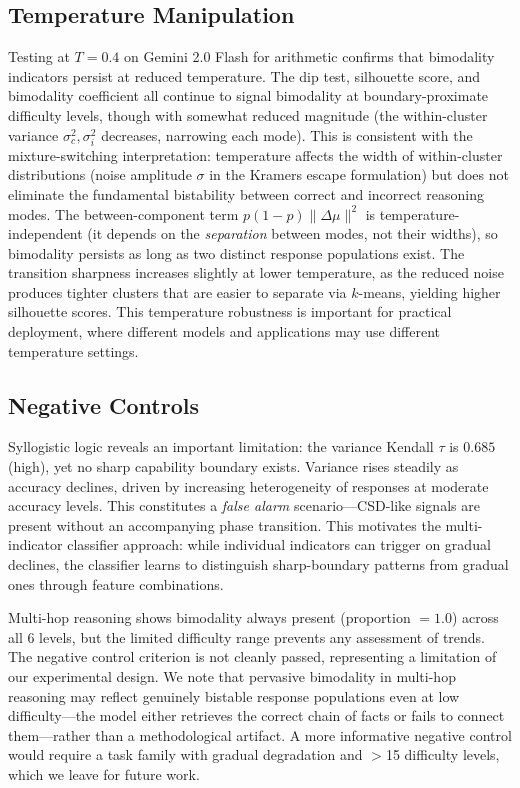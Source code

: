 \documentclass[11pt,letterpaper]{article}
\begin{document}
\subsection{Temperature Manipulation}

Testing at $T = 0.4$ on Gemini 2.0 Flash for arithmetic confirms that bimodality indicators persist at reduced temperature. The dip test, silhouette score, and bimodality coefficient all continue to signal bimodality at boundary-proximate difficulty levels, though with somewhat reduced magnitude (the within-cluster variance $\sigma_c^2, \sigma_i^2$ decreases, narrowing each mode). This is consistent with the mixture-switching interpretation: temperature affects the width of within-cluster distributions (noise amplitude $\sigma$ in the Kramers escape formulation) but does not eliminate the fundamental bistability between correct and incorrect reasoning modes. The between-component term $p(1{-}p)\|\Delta\mu\|^2$ is temperature-independent (it depends on the \emph{separation} between modes, not their widths), so bimodality persists as long as two distinct response populations exist. The transition sharpness increases slightly at lower temperature, as the reduced noise produces tighter clusters that are easier to separate via $k$-means, yielding higher silhouette scores. This temperature robustness is important for practical deployment, where different models and applications may use different temperature settings.

\subsection{Negative Controls}

Syllogistic logic reveals an important limitation: the variance Kendall $\tau$ is $0.685$ (high), yet no sharp capability boundary exists. Variance rises steadily as accuracy declines, driven by increasing heterogeneity of responses at moderate accuracy levels. This constitutes a \emph{false alarm} scenario---CSD-like signals are present without an accompanying phase transition. This motivates the multi-indicator classifier approach: while individual indicators can trigger on gradual declines, the classifier learns to distinguish sharp-boundary patterns from gradual ones through feature combinations.

Multi-hop reasoning shows bimodality always present (proportion $= 1.0$) across all 6 levels, but the limited difficulty range prevents any assessment of trends. The negative control criterion is not cleanly passed, representing a limitation of our experimental design. We note that pervasive bimodality in multi-hop reasoning may reflect genuinely bistable response populations even at low difficulty---the model either retrieves the correct chain of facts or fails to connect them---rather than a methodological artifact. A more informative negative control would require a task family with gradual degradation and $>$15 difficulty levels, which we leave for future work.
\end{document}

